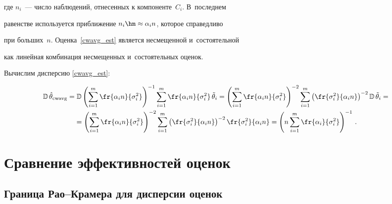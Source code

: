 где $n_i$~--- число наблюдений, отнесенных к компоненте~$C_i$. В~последнем 


равенстве используется приближение $n_i \hm\approx \alpha_i n$, которое справедливо 


при больших~$n$. Оценка~\eqref{cwavg_est} является несмещенной и~состоятельной 


как линейная комбинация несмещенных и~состоятельных оценок.








Вычислим дисперсию \eqref{cwavg_est}:


\begin{multline*}


\mathbb{D}\,\hat{\theta}_{\mathrm{cwavg}} = \mathbb{D} \left(\sum\limits_{i=1}^m 


\fr{\alpha_i n}{\sigma_i^2}\right)^{-1} \sum\limits_{i=1}^m \fr{\alpha_i 


n}{\sigma_i^2} \,\tilde{\theta}_i =


\left(\sum\limits_{i=1}^m \fr{\alpha_i n}{\sigma_i^2}\right)^{-2} 


\sum\limits_{i=1}^m \left(\fr{\sigma_i^2}{\alpha_i n}\right)^{-2} \mathbb{D} \,


\tilde{\theta}_i ={} \\


= \left(\sum\limits_{i=1}^m \fr{\alpha_i n}{\sigma_i^2}\right)^{-2} 


\sum\limits_{i=1}^m \left(\fr{\sigma_i^2}{\alpha_i n}\right)^{-2} 


\fr{\sigma_i^2}{\alpha_i n} = \left(n \sum\limits_{i=1}^m 


\fr{\alpha_i}{\sigma_i^2}\right)^{-1}\,.


\end{multline*}








\section{Сравнение эффективностей оценок}





\subsection{Граница Рао--Крамера для дисперсии оценок}








